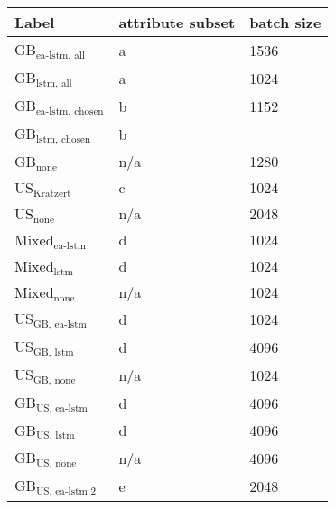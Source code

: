 \begin{tabular}{lll}
    \toprule
    Label & attribute subset & batch size \\
    \midrule
    GB$_\text{ea-lstm, all}$ & a &  1536 \\
    GB$_\text{lstm, all}$ & a & 1024 \\
    GB$_\text{ea-lstm, chosen}$ & b & 1152 \\
    GB$_\text{lstm, chosen}$ & b &  \\
    GB$_\text{none}$ & n/a & 1280 \\
    US$_\text{Kratzert}$  & c & 1024 \\
    US$_\text{none}$  & n/a & 2048 \\
    Mixed$_\text{ea-lstm}$ & d & 1024 \\
    Mixed$_\text{lstm}$ & d & 1024 \\
    Mixed$_\text{none}$ & n/a & 1024 \\
    US$_\text{GB, ea-lstm}$ & d  & 1024 \\
    US$_\text{GB, lstm}$ & d  & 4096 \\
    US$_\text{GB, none}$ & n/a & 1024 \\
    GB$_\text{US, ea-lstm}$ & d & 4096 \\
    GB$_\text{US, lstm}$  & d & 4096 \\ 
    GB$_\text{US, none}$  & n/a & 4096 \\
    GB$_\text{US, ea-lstm 2}$ & e & 2048 \\

\end{tabular}
